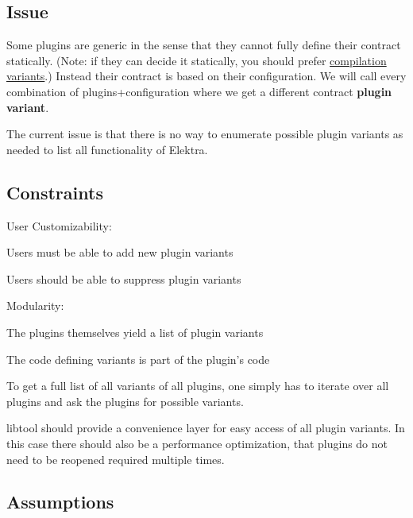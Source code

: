 \subsection*{Issue}

Some plugins are generic in the sense that they cannot fully define their contract statically. (Note\+: if they can decide it statically, you should prefer \hyperlink{doc_tutorials_compilation-variants_md}{compilation variants}.) Instead their contract is based on their configuration. We will call every combination of plugins+configuration where we get a different contract {\bfseries plugin variant}.

The current issue is that there is no way to enumerate possible plugin variants as needed to list all functionality of Elektra.

\subsection*{Constraints}


\begin{DoxyItemize}
\item User Customizability\+:
\begin{DoxyItemize}
\item Users must be able to add new plugin variants
\item Users should be able to suppress plugin variants
\end{DoxyItemize}
\item Modularity\+:
\begin{DoxyItemize}
\item The plugins themselves yield a list of plugin variants
\item The code defining variants is part of the plugin's code
\item To get a full list of all variants of all plugins, one simply has to iterate over all plugins and ask the plugins for possible variants.
\end{DoxyItemize}
\item libtool should provide a convenience layer for easy access of all plugin variants. In this case there should also be a performance optimization, that plugins do not need to be reopened required multiple times.
\end{DoxyItemize}

\subsection*{Assumptions}


